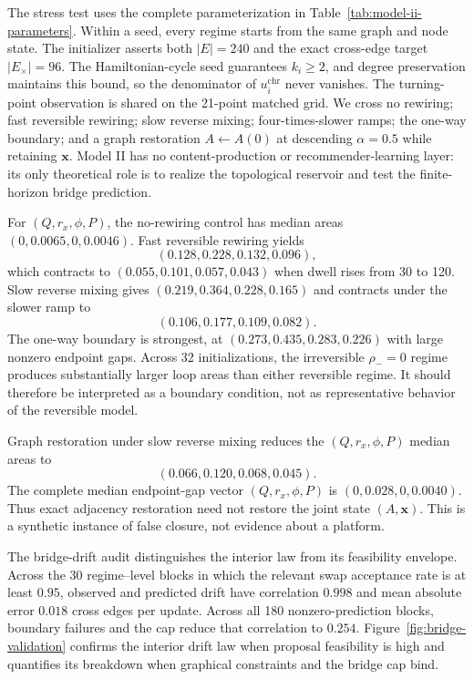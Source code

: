 \documentclass[pdflatex,sn-mathphys-num]{sn-jnl}
\begin{document}
The stress test uses the complete parameterization in Table~\ref{tab:model-ii-parameters}. Within a seed, every regime starts from the same graph and node state. The initializer asserts both $|E|=240$ and the exact cross-edge target $|E_\times|=96$. The Hamiltonian-cycle seed guarantees $k_i\geq2$, and degree preservation maintains this bound, so the denominator of $u_i^{\mathrm{chr}}$ never vanishes. The turning-point observation is shared on the 21-point matched grid. We cross no rewiring; fast reversible rewiring; slow reverse mixing; four-times-slower ramps; the one-way boundary; and a graph restoration $A\leftarrow A(0)$ at descending $\alpha=0.5$ while retaining $\bm x$. Model II has no content-production or recommender-learning layer: its only theoretical role is to realize the topological reservoir and test the finite-horizon bridge prediction.

For $(Q,r_x,\phi,P)$, the no-rewiring control has median areas $(0,0.0065,0,0.0046)$. Fast reversible rewiring yields
\begin{equation}
(0.128,0.228,0.132,0.096),
\end{equation}
which contracts to $(0.055,0.101,0.057,0.043)$ when dwell rises from 30 to 120. Slow reverse mixing gives $(0.219,0.364,0.228,0.165)$ and contracts under the slower ramp to
\begin{equation}
(0.106,0.177,0.109,0.082).
\end{equation}
The one-way boundary is strongest, at $(0.273,0.435,0.283,0.226)$ with large nonzero endpoint gaps. Across 32 initializations, the irreversible $\rho_-=0$ regime produces substantially larger loop areas than either reversible regime. It should therefore be interpreted as a boundary condition, not as representative behavior of the reversible model.

Graph restoration under slow reverse mixing reduces the $(Q,r_x,\phi,P)$ median areas to
\begin{equation}
(0.066,0.120,0.068,0.045).
\end{equation}
The complete median endpoint-gap vector $(Q,r_x,\phi,P)$ is $(0,0.028,0,0.0040)$. Thus exact adjacency restoration need not restore the joint state $(A,\bm x)$. This is a synthetic instance of false closure, not evidence about a platform.

The bridge-drift audit distinguishes the interior law from its feasibility envelope. Across the 30 regime--level blocks in which the relevant swap acceptance rate is at least $0.95$, observed and predicted drift have correlation $0.998$ and mean absolute error $0.018$ cross edges per update. Across all 180 nonzero-prediction blocks, boundary failures and the cap reduce that correlation to $0.254$. Figure~\ref{fig:bridge-validation} confirms the interior drift law when proposal feasibility is high and quantifies its breakdown when graphical constraints and the bridge cap bind.
\end{document}
